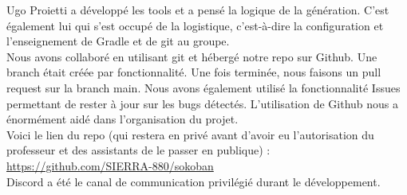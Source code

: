 \documentclass[../main.tex]{subfiles}
\begin{document}
Ugo Proietti a développé les tools et a pensé la logique de la génération. C’est également lui qui s’est occupé de la logistique, c'est-à-dire la configuration et l’enseignement de Gradle et de git au groupe. \\

Nous avons collaboré en utilisant git et hébergé notre repo sur Github. Une branch était créée par fonctionnalité. Une fois terminée, nous faisons un pull request sur la branch main. Nous avons également utilisé la fonctionnalité Issues permettant de rester à jour sur les bugs détectés. L’utilisation de Github nous a énormément aidé dans l’organisation du projet. \\
Voici le lien du repo (qui restera en privé avant d’avoir eu l’autorisation du professeur et des assistants de le passer en publique) : 
\href{https://github.com/SIERRA-880/sokoban}{https://github.com/SIERRA-880/sokoban} \\

Discord a été le canal de communication privilégié durant le développement. \\

\newpage
\end{document}
